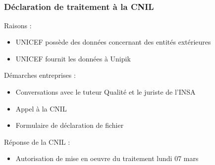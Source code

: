 \subsection{} 

\begin{frame}
\frametitle{Déclaration de traitement à la CNIL}
	Raisons : 
	\begin{itemize}
		\item UNICEF possède des données concernant des entités extérieures
		\item UNICEF fournit les données à Unipik
	\end{itemize}
	
	Démarches entreprises :
	\begin{itemize}
		\item Conversations avec le tuteur Qualité et le juriste de l'INSA
		\item Appel à la CNIL
		\item Formulaire de déclaration de fichier 
	\end{itemize}
	
	Réponse de la CNIL :
	\begin{itemize}
		\item Autorisation de mise en oeuvre du traitement lundi 07 mars
	\end{itemize}
	
\end{frame}